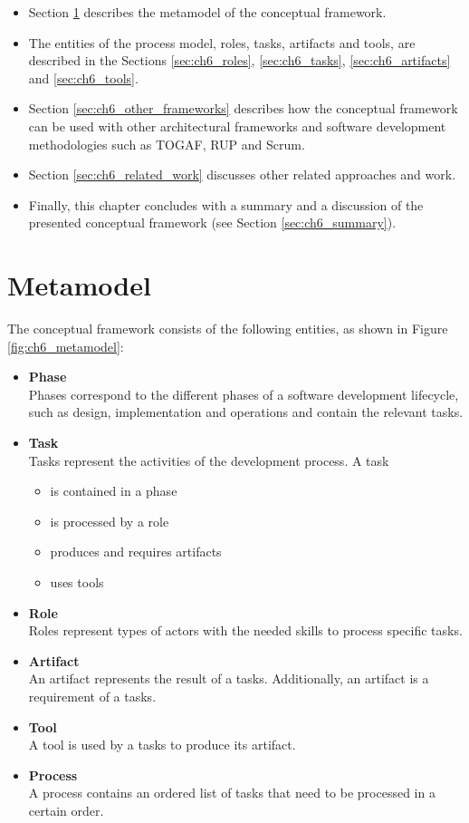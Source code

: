 \begin{itemize}
	\item Section \ref{sec:ch6_metamodel} describes the metamodel of the conceptual framework.
	\item The entities of the process model, roles, tasks, artifacts and tools, are described in the Sections \ref{sec:ch6_roles}, \ref{sec:ch6_tasks}, \ref{sec:ch6_artifacts} and \ref{sec:ch6_tools}.
	\item Section \ref{sec:ch6_other_frameworks} describes how the conceptual framework can be used with other architectural frameworks and software development methodologies such as TOGAF, \acf{RUP} and Scrum.
	\item Section \ref{sec:ch6_related_work} discusses other related approaches and work.
	\item Finally, this chapter concludes with a summary and a discussion of the presented conceptual framework (see Section \ref{sec:ch6_summary}).
\end{itemize}

\section{Metamodel}
\label{sec:ch6_metamodel}
The conceptual framework consists of the following entities, as shown in Figure \ref{fig:ch6_metamodel}:
\begin{itemize}
	\item \textbf{Phase}\\
	Phases correspond to the different phases of a software development lifecycle, such as design, implementation and operations and contain the relevant tasks.
	\item \textbf{Task}\\
	Tasks represent the activities of the development process. A task
	\begin{itemize}
		\item is contained in a phase
		\item is processed by a role
		\item produces and requires artifacts
		\item uses tools
	\end{itemize}
	\item \textbf{Role}\\
	Roles represent types of actors with the needed skills to process specific tasks.
	\item \textbf{Artifact}\\
	An artifact represents the result of a tasks. Additionally, an artifact is a requirement of a tasks.
	\item \textbf{Tool}\\
	A tool is used by a tasks to produce its artifact.
	\item \textbf{Process}\\
	A process contains an ordered list of tasks that need to be processed in a certain order.
\end{itemize}

